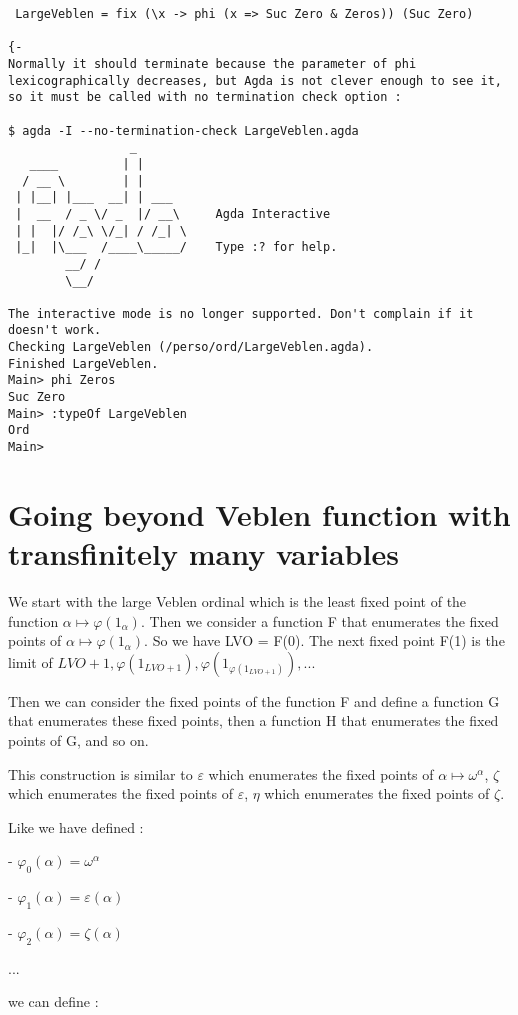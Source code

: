 \documentclass[10pt]{article}
\begin{document}
\begin{verbatim}
 LargeVeblen = fix (\x -> phi (x => Suc Zero & Zeros)) (Suc Zero)

{-
Normally it should terminate because the parameter of phi lexicographically decreases, but Agda is not clever enough to see it, 
so it must be called with no termination check option :

$ agda -I --no-termination-check LargeVeblen.agda
                 _ 
   ____         | |
  / __ \        | |
 | |__| |___  __| | ___
 |  __  / _ \/ _  |/ __\     Agda Interactive
 | |  |/ /_\ \/_| / /_| \
 |_|  |\___  /____\_____/    Type :? for help.
        __/ /
        \__/

The interactive mode is no longer supported. Don't complain if it doesn't work.
Checking LargeVeblen (/perso/ord/LargeVeblen.agda).
Finished LargeVeblen.
Main> phi Zeros
Suc Zero
Main> :typeOf LargeVeblen
Ord
Main> 

\end{verbatim}

\section{Going beyond Veblen function with transfinitely many variables}


We start with the large Veblen ordinal which is the least fixed point of the function \( \alpha \mapsto \varphi(1_\alpha) \). Then we consider a function F that enumerates the fixed points of \( \alpha \mapsto \varphi(1_\alpha) \). So we have LVO = F(0). The next fixed point F(1) is the limit of \( LVO+1, \varphi(1_{LVO+1}), \varphi(1_{\varphi(1_{LVO+1})}), ... \)

Then we can consider the fixed points of the function F and define a function G that enumerates these fixed points, then a function H that enumerates the fixed points of G, and so on.

This construction is similar to \( \varepsilon \) which enumerates the fixed points of \( \alpha \mapsto \omega^\alpha \), \( \zeta \) which enumerates the fixed points of \( \varepsilon \), \( \eta \) which enumerates the fixed points of \( \zeta \).

Like we have defined :

 - \( \varphi_0(\alpha) = \omega^\alpha \)

 - \( \varphi_1(\alpha) = \varepsilon(\alpha) \)

 - \( \varphi_2(\alpha) = \zeta(\alpha) \)

...

we can define :
\end{document}

